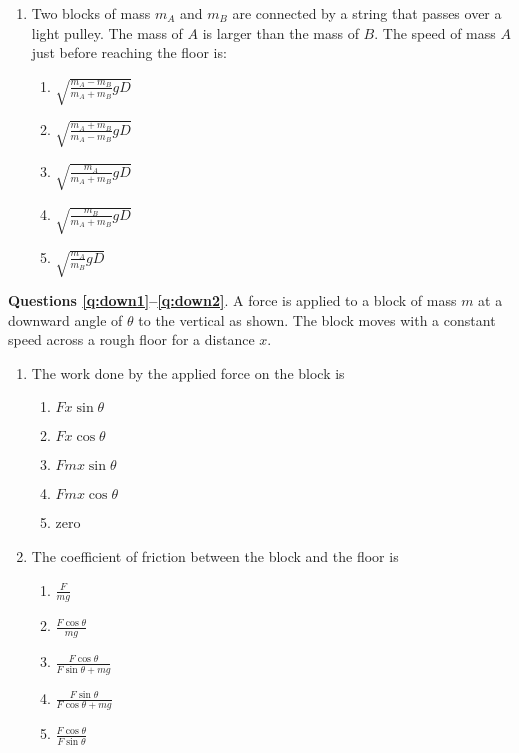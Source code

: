 \documentclass{../../../oss-legalpaper}
\begin{document}
\begin{multicols}{2}
\begin{enumerate}[leftmargin=18pt,resume]
  \item Two blocks of mass $m_A$ and $m_B$ are connected by a string that
    passes over a light pulley. The mass of $A$ is larger than the mass of $B$.
    The speed of mass $A$ just before reaching the floor is:
    \begin{center}
    \end{center}
    \begin{enumerate}[noitemsep,topsep=0pt,leftmargin=18pt,label=(\Alph*)]
    \item $\displaystyle\sqrt{\frac{m_A-m_B}{m_A+m_B}gD}$
    \item $\displaystyle\sqrt{\frac{m_A+m_B}{m_A-m_B}gD}$
    \item $\displaystyle\sqrt{\frac{m_A}{m_A+m_B}gD}$
    \item $\displaystyle\sqrt{\frac{m_B}{m_A+m_B}gD}$
    \item $\displaystyle\sqrt{\frac{m_A}{m_B}gD}$
    \end{enumerate}
  \end{enumerate}
  \columnbreak
  
  \textbf{Questions \ref{q:down1}--\ref{q:down2}}. A force is applied to a block
  of mass $m$ at a downward angle of $\theta$ to the vertical as shown. The
  block moves with a constant speed across a rough floor for a distance $x$.
  \begin{center}
  \end{center}
  \begin{enumerate}[resume,leftmargin=18pt]
  \item The work done by the applied force on the block is
    \label{q:down1}
    \begin{enumerate}[noitemsep,topsep=0pt,leftmargin=18pt,label=(\Alph*)]
    \item $Fx\sin\theta$
    \item $Fx\cos\theta$
    \item $Fmx\sin\theta$
    \item $Fmx\cos\theta$
    \item zero
    \end{enumerate}
    
  \item The coefficient of friction between the block and the floor is
    \label{q:down2}
    \begin{enumerate}[noitemsep,topsep=0pt,leftmargin=18pt,label=(\Alph*)]
    \item $\displaystyle\frac{F}{mg}$
    \item $\displaystyle\frac{F\cos\theta}{mg}$
    \item $\displaystyle\frac{F\cos\theta}{F\sin\theta+mg}$
    \item $\displaystyle\frac{F\sin\theta}{F\cos\theta+mg}$
    \item $\displaystyle\frac{F\cos\theta}{F\sin\theta}$
    \end{enumerate}
  \end{enumerate}
  \columnbreak
  

\end{multicols}
\end{document}
